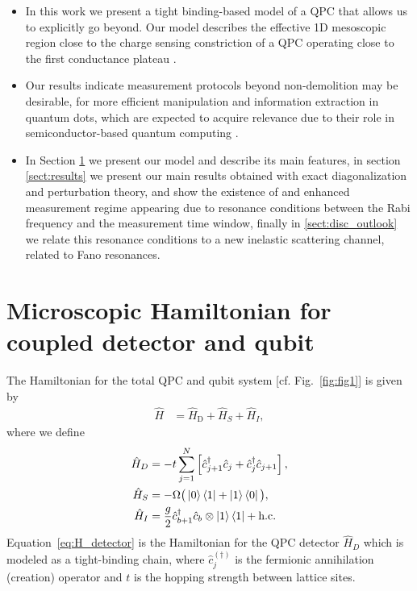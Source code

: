 \documentclass[10pt,
 amsmath,amssymb,
 aps,prb, twocolumn
]{revtex4-2}
\newcommand\sj[1]{ {\color{cyan} #1} }
\begin{document}
\begin{itemize}
    \item In this work we present a tight binding-based model of a QPC that allows us to explicitly go beyond. Our model describes the effective 1D mesoscopic region close to the charge sensing constriction \cite{tekman1991, bruusManyBodyQuantum2004} of a QPC operating close to the first conductance plateau \cite{vanwees1988,  wharam1988, vanhouten1996}.

    \item Our results indicate measurement protocols \sj{beyond non-demolition} may be desirable, for more efficient manipulation and information extraction in quantum dots, which are expected to acquire relevance due to their role in semiconductor-based quantum computing \cite{lossQuantumComputation1998, scappucciGermaniumQuantum2021}.
    
    \item In Section \ref{sect:model} we present our model and describe its main features, in section \ref{sect:results} we present our main results obtained with exact diagonalization and perturbation theory, and show the existence of and enhanced measurement regime appearing due to resonance conditions between the Rabi frequency and the measurement time window, finally in \ref{sect:disc_outlook} we relate this resonance conditions to a new inelastic scattering channel, related to Fano resonances.
\end{itemize}

\section{Microscopic Hamiltonian for coupled detector and qubit}\label{sect:model}
The Hamiltonian for the total QPC and qubit system [cf. Fig.~\ref{fig:fig1}] is given by
\begin{align} 
\label{eq:qpc_dd_H}
     \hat{H} &= \hat{H}_{\text{D}} + \hat{H}_{S} +  \hat{H}_I,
\end{align}
where we define
\begin{subequations}
\begin{align}
    \hat{H}_D&= -t \sum_{j=1}^N\left[ \hat{c}^{\dagger}_{j+1}\hat{c}_{j} + \hat{c}^{\dagger}_{j}\hat{c}_{j+1}  \right], \label{eq:H_detector} \\
    \hat{H}_S &= -\Omega \big(\ket{0}\bra{1} + \ket{1}\bra{0}\big), \label{eq:H_qubit} \\
    \hat{H}_I &= \frac{g}{2}\hat{c}^{\dagger}_{b+1}\hat{c}_{b} \otimes \ket{1}\bra{1}  + \text{h.c}. \label{eq:H_int}
\end{align}
\end{subequations}
Equation~\eqref{eq:H_detector} is the Hamiltonian for the QPC detector \mbox{$\hat{H}_D$} which is modeled as a tight-binding chain, where \mbox{$\hat{c}_j^{(\dagger)}$}
is the fermionic annihilation (creation) operator and \mbox{$t$} is the hopping strength between lattice sites. 
\end{document}
